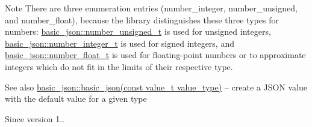 \begin{DoxyNote}{Note}
There are three enumeration entries (number\+\_\+integer, number\+\_\+unsigned, and number\+\_\+float), because the library distinguishes these three types for numbers\+: \hyperlink{classnlohmann_1_1basic__json_ab906e29b5d83ac162e823ada2156b989}{basic\+\_\+json\+::number\+\_\+unsigned\+\_\+t} is used for unsigned integers, \hyperlink{classnlohmann_1_1basic__json_a98e611d67b7bd75307de99c9358ab2dc}{basic\+\_\+json\+::number\+\_\+integer\+\_\+t} is used for signed integers, and \hyperlink{classnlohmann_1_1basic__json_a88d6103cb3620410b35200ee8e313d97}{basic\+\_\+json\+::number\+\_\+float\+\_\+t} is used for floating-\/point numbers or to approximate integers which do not fit in the limits of their respective type.
\end{DoxyNote}
\begin{DoxySeeAlso}{See also}
\hyperlink{classnlohmann_1_1basic__json_aed115142bd0c6c66c864700e0467df55}{basic\+\_\+json\+::basic\+\_\+json(const value\+\_\+t value\+\_\+type)} -- create a J\+S\+ON value with the default value for a given type
\end{DoxySeeAlso}
\begin{DoxySince}{Since}
version 1.. 
\end{DoxySince}
